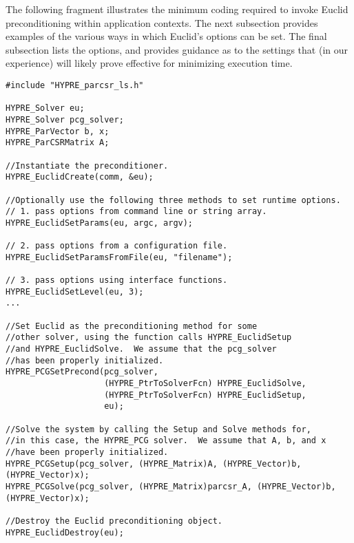 
The following fragment illustrates the minimum coding %
required to invoke Euclid preconditioning within \hypre{} application contexts.
The next subsection provides examples of the various ways in which
Euclid's options can be set. 
The final subsection lists the options,
and provides guidance as to the settings that (in our experience) 
will likely prove effective for minimizing execution time.

\begin{display}
\begin{verbatim}
#include "HYPRE_parcsr_ls.h"

HYPRE_Solver eu;
HYPRE_Solver pcg_solver;
HYPRE_ParVector b, x;
HYPRE_ParCSRMatrix A;

//Instantiate the preconditioner.
HYPRE_EuclidCreate(comm, &eu);

//Optionally use the following three methods to set runtime options.
// 1. pass options from command line or string array.
HYPRE_EuclidSetParams(eu, argc, argv);

// 2. pass options from a configuration file.
HYPRE_EuclidSetParamsFromFile(eu, "filename");

// 3. pass options using interface functions.
HYPRE_EuclidSetLevel(eu, 3);
...

//Set Euclid as the preconditioning method for some
//other solver, using the function calls HYPRE_EuclidSetup
//and HYPRE_EuclidSolve.  We assume that the pcg_solver
//has been properly initialized.
HYPRE_PCGSetPrecond(pcg_solver,
                    (HYPRE_PtrToSolverFcn) HYPRE_EuclidSolve,
                    (HYPRE_PtrToSolverFcn) HYPRE_EuclidSetup,
                    eu);

//Solve the system by calling the Setup and Solve methods for, 
//in this case, the HYPRE_PCG solver.  We assume that A, b, and x
//have been properly initialized.
HYPRE_PCGSetup(pcg_solver, (HYPRE_Matrix)A, (HYPRE_Vector)b, (HYPRE_Vector)x);
HYPRE_PCGSolve(pcg_solver, (HYPRE_Matrix)parcsr_A, (HYPRE_Vector)b, (HYPRE_Vector)x);

//Destroy the Euclid preconditioning object.
HYPRE_EuclidDestroy(eu);

\end{verbatim}
\end{display}

